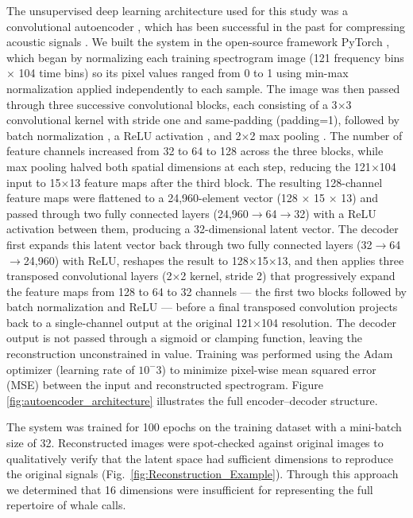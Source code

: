\documentclass[preprint,NumberedRefs]{JASAnew}
\begin{document}
The unsupervised deep learning architecture used for this study was a convolutional autoencoder \cite{hinton2006reducing}, which has been successful in the past for compressing acoustic signals \cite{ozanich2021deep,chien2023automatic}. We built the system in the open-source framework PyTorch \cite{paszke2019pytorch}, which began by normalizing each training spectrogram image (121 frequency bins $\times$ 104 time bins) so its pixel values ranged from 0 to 1 using min-max normalization applied independently to each sample. The image was then passed through three successive convolutional blocks, each consisting of a 3$\times$3 convolutional kernel with stride one and same-padding (padding=1), followed by batch normalization \cite{ioffe2015batch}, a ReLU activation \cite{nair2010rectified}, and 2$\times$2 max pooling \cite{lecun1998gradient}. The number of feature channels increased from 32 to 64 to 128 across the three blocks, while max pooling halved both spatial dimensions at each step, reducing the 121$\times$104 input to 15$\times$13 feature maps after the third block. The resulting 128-channel feature maps were flattened to a 24,960-element vector (128 $\times$ 15 $\times$ 13) and passed through two fully connected layers (24,960$\to$64$\to$32) with a ReLU activation between them, producing a 32-dimensional latent vector. The decoder first expands this latent vector back through two fully connected layers (32$\to$64$\to$24,960) with ReLU, reshapes the result to 128$\times$15$\times$13, and then applies three transposed convolutional layers (2$\times$2 kernel, stride 2) that progressively expand the feature maps from 128 to 64 to 32 channels — the first two blocks followed by batch normalization and ReLU — before a final transposed convolution projects back to a single-channel output at the original 121$\times$104 resolution. The decoder output is not passed through a sigmoid or clamping function, leaving the reconstruction unconstrained in value. Training was performed using the Adam optimizer \cite{kingma2015adam} (learning rate of $10^-3$) to minimize pixel-wise mean squared error (MSE) between the input and reconstructed spectrogram. Figure \ref{fig:autoencoder_architecture} illustrates the full encoder–decoder structure.

The system was trained for 100 epochs on the training dataset with a mini-batch size of 32. Reconstructed images were spot-checked against original images to qualitatively verify that the latent space had sufficient dimensions to reproduce the original signals (Fig.~\ref{fig:Reconstruction_Example}). Through this approach we determined that 16 dimensions were insufficient for representing the full repertoire of whale calls. 
\end{document}

